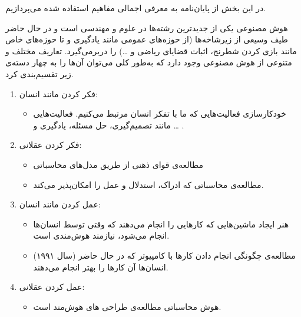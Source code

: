 
در این بخش از پایان‌نامه به معرفی اجمالی مفاهیم استفاده شده می‌پردازیم.

هوش مصنوعی یکی از جدیدترین رشته‌ها در علوم و مهندسی است و در حال حاضر طیف وسیعی از زیرشاخه‌ها (از حوزه‌های عمومی مانند یادگیری و  
تا حوزه‌های خاص مانند بازی کردن شطرنج، اثبات قضایای ریاضی و …) را دربرمی‌گیرد. تعاریف مختلف و متنوعی از هوش مصنوعی وجود دارد که به‌طور کلی می‌توان آن‌ها را به چهار دسته‌ی زیر تقسیم‌بندی کرد. 
\begin{enumerate}
\item فکر کردن مانند انسان:
    \begin{itemize}
        \item خودکارسازی فعالیت‌هایی که ما با تفکر انسان مرتبط می‌کنیم. فعالیت‌هایی مانند تصمیم‌گیری، حل مسئله، یادگیری و … .        
    \end{itemize}

\item فکر کردن عقلانی:
    \begin{itemize}
        \item 
            مطالعه‌ی قوای ذهنی از طریق مدل‌های محاسباتی
        \item
            مطالعه‌ی محاسباتی که ادراک، استدلال و عمل را امکان‌پذیر می‌کند.
    \end{itemize}
    
\item عمل کردن مانند انسان:
    \begin{itemize}
        \item 
            هنر ایجاد ماشین‌هایی که کارهایی را انجام می‌دهند که وقتی توسط انسان‌ها انجام می‌شود، نیازمند هوش‌مندی است.
        \item
            مطالعه‌ی چگونگی انجام دادن کارها با کامپیوتر که در حال حاضر (سال ۱۹۹۱) انسان‌ها آن کارها را بهتر انجام می‌دهند. 
    \end{itemize}
\item عمل کردن عقلانی:
    \begin{itemize}
        \item 
        هوش محاسباتی مطالعه‌ی طراحی 
        ‌های
        هوش‌مند است.
    \end{itemize}

\end{enumerate}

